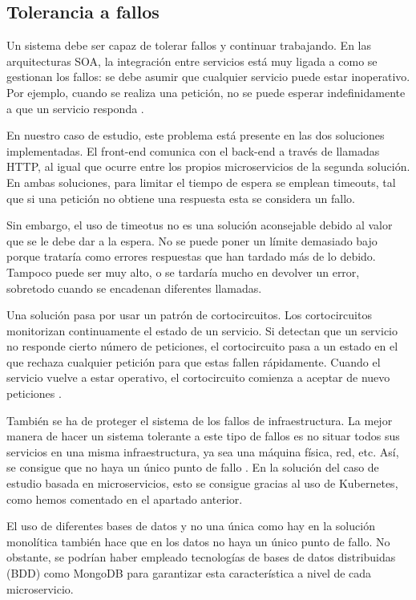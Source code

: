 \documentclass[11pt,spanish,listoffigures]{tfgetsinf}
\begin{document}
\subsection{Tolerancia a fallos}

Un sistema debe ser capaz de tolerar fallos y continuar trabajando. En las arquitecturas SOA, la integración entre servicios está muy ligada a como se gestionan los fallos: se debe asumir que cualquier servicio puede estar inoperativo. Por ejemplo, cuando se realiza una petición, no se puede esperar indefinidamente a que un servicio responda \cite{Newman2015a}.

En nuestro caso de estudio, este problema está presente en las dos soluciones implementadas. El front-end comunica con el back-end a través de llamadas HTTP, al igual que ocurre entre los propios microservicios de la segunda solución. En ambas soluciones, para limitar el tiempo de espera se emplean timeouts, tal que si una petición no obtiene una respuesta esta se considera un fallo.

Sin embargo, el uso de timeotus no es una solución aconsejable debido al valor que se le debe dar a la espera. No se puede poner un límite demasiado bajo porque trataría como errores respuestas que han tardado más de lo debido. Tampoco puede ser muy alto, o se tardaría mucho en devolver un error, sobretodo cuando se encadenan diferentes llamadas.

Una solución pasa por usar un patrón de cortocircuitos. Los cortocircuitos monitorizan continuamente el estado de un servicio. Si detectan que un servicio no responde cierto número de peticiones, el cortocircuito pasa a un estado en el que rechaza cualquier petición para que estas fallen rápidamente. Cuando el servicio vuelve a estar operativo, el cortocircuito comienza a aceptar de nuevo peticiones \cite{Richards2016}.

También se ha de proteger el sistema de los fallos de infraestructura. La mejor manera de hacer un sistema tolerante a este tipo de fallos es no situar todos sus servicios en una misma infraestructura, ya sea una máquina física, red, etc. Así, se consigue que no haya un único punto de fallo \cite{Newman2015a}. En la solución del caso de estudio basada en microservicios, esto se consigue gracias al uso de Kubernetes, como hemos comentado en el apartado anterior.

El uso de diferentes bases de datos y no una única como hay en la solución monolítica también hace que en los datos no haya un único punto de fallo. No obstante, se podrían haber empleado tecnologías de bases de datos distribuidas (BDD) como MongoDB para garantizar esta característica a nivel de cada microservicio.
\end{document}
